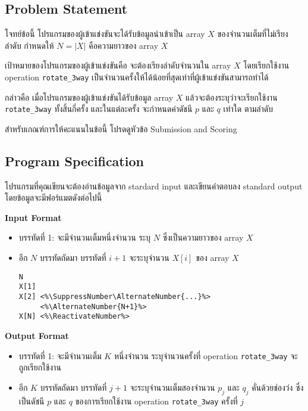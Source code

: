 \subsection*{\sectionfont\upshape Problem Statement}

โจทย์ข้อนี้ โปรแกรมของผู้เข้าแข่งขันจะได้รับข้อมูลนำเข้าเป็น array $X$ ของจำนวนเต็มที่ไม่เรียงลำดับ 
กำหนดให้ $N = |X|$ คือความยาวของ array $X$

เป้าหมายของโปรแกรมของผู้เข้าแข่งขันคือ 
จะต้องเรียงลำดับจำนวนใน array $X$ โดยเรียกใช้งาน operation \lstinline|rotate_3way| 
เป็นจำนวนครั้งให้ได้น้อยที่สุดเท่าที่ผู้เข้าแข่งขันสามารถทำได้

กล่าวคือ เมื่อโปรแกรมของผู้เข้าแข่งขันได้รับข้อมูล array $X$ แล้วจะต้องระบุว่าจะเรียกใช้งาน 
\lstinline|rotate_3way| ทั้งสิ้นกี่ครั้ง และในแต่ละครั้ง จะกำหนดค่าดัชนี $p$ และ $q$ เท่าใด
ตามลำดับ

สำหรับเกณฑ์การให้คะแนนในข้อนี้ โปรดดูหัวข้อ Submission and Scoring

\subsection*{\sectionfont\upshape Program Specification}

โปรแกรมที่คุณเขียนจะต้องอ่านข้อมูลจาก stardard input 
และเขียนคำตอบลง standard output โดยข้อมูลจะมีฟอร์แมตดังต่อไปนี้

\bigskip\noindent
{\sectionfont\bfseries Input Format}
\begin{itemize}
\item บรรทัดที่ 1: จะมีจำนวนเต็มหนึ่งจำนวน ระบุ $N$ ซึ่งเป็นความยาวของ array $X$
\item อีก $N$ บรรทัดถัดมา บรรทัดที่ $i+1$ จะระบุจำนวน $X[i]$ ของ array $X$
\begin{lstlisting}
N
X[1]
X[2] <%\SuppressNumber\AlternateNumber{...}%>
     <%\AlternateNumber{N+1}%>
X[N] <%\ReactivateNumber%>
\end{lstlisting}
\end{itemize}

\medskip\noindent
{\sectionfont\bfseries Output Format}
\begin{itemize}
\item บรรทัดที่ 1: จะมีจำนวนเต็ม $K$ หนึ่งจำนวน ระบุจำนวนครั้งที่ operation \lstinline|rotate_3way| 
    จะถูกเรียกใช้งาน
\item อีก $K$ บรรทัดถัดมา บรรทัดที่ $j+1$ จะระบุจำนวนเต็มสองจำนวน $p_j$ และ $q_j$ 
    คั่นด้วยช่องว่ง ซึ่งเป็นดัชนี $p$ และ $q$ ของการเรียกใช้งาน operation \lstinline|rotate_3way| 
    ครั้งที่ $j$
\end{itemize}

